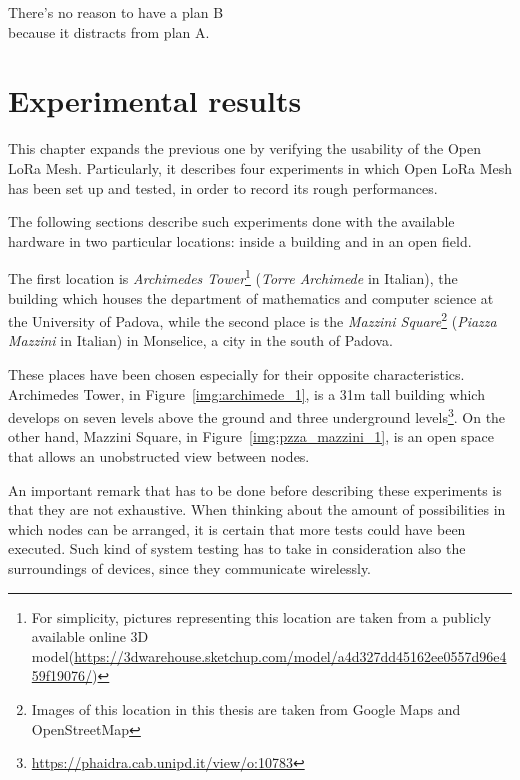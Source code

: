 
\begin{savequote}[60mm]
	There's no reason to have a plan B\\
	because it distracts from plan A.
\end{savequote}

\chapter{Experimental results}\label{chapter:results}
	
	This chapter expands the previous one by verifying the usability of the Open LoRa Mesh.
	Particularly, it describes four experiments in which Open LoRa Mesh has been set up and tested, in order to record its rough performances.
	
	The following sections describe such experiments done with the available hardware in two particular locations: inside a building and in an open field.
	
	The first location is \textit{Archimedes Tower}\footnote{ For simplicity, pictures representing this location are taken from a publicly available online 3D model\newline (\url{https://3dwarehouse.sketchup.com/model/a4d327dd45162ee0557d96e459f19076/})} (\textit{Torre Archimede} in Italian), the building which houses the department of mathematics and computer science at the University of Padova, while the second place is the \textit{Mazzini Square}\footnote{ Images of this location in this thesis are taken from Google Maps and OpenStreetMap} (\textit{Piazza Mazzini} in Italian) in Monselice, a city in the south of Padova.
	
	These places have been chosen especially for their opposite characteristics.
	Archimedes Tower, in Figure~\ref{img:archimede_1}, is a 31m tall building which develops on seven levels above the ground and three underground levels\footnote{ \url{https://phaidra.cab.unipd.it/view/o:10783}}.
	On the other hand, Mazzini Square, in Figure~\ref{img:pzza_mazzini_1}, is an open space that allows an unobstructed view between nodes.
	
	An important remark that has to be done before describing these experiments is that they are not exhaustive.
	When thinking about the amount of possibilities in which nodes can be arranged, it is certain that more tests could have been executed.
	Such kind of system testing has to take in consideration also the surroundings of devices, since they communicate wirelessly.
	
